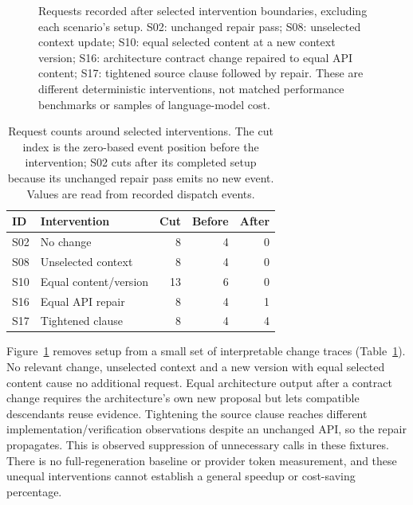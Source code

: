 \documentclass[pdflatex,sn-mathphys-num]{sn-jnl}
\theoremstyle{thmstyleone}
\theoremstyle{thmstylethree}
\theoremstyle{thmstyletwo}
\begin{document}
\begin{figure}[tbp]\centering
{}
\caption{Requests recorded after selected intervention boundaries, excluding each scenario's setup. S02: unchanged repair pass; S08: unselected context update; S10: equal selected content at a new context version; S16: architecture contract change repaired to equal API content; S17: tightened source clause followed by repair. These are different deterministic interventions, not matched performance benchmarks or samples of language-model cost.}\label{fig:request-deltas}
\end{figure}

\begin{table}[tbp]
\centering
\caption{Request counts around selected interventions. The cut index is the zero-based event position before the intervention; S02 cuts after its completed setup because its unchanged repair pass emits no new event. Values are read from recorded dispatch events.}\label{tab:request-interventions}
\footnotesize
\setlength{\tabcolsep}{3pt}
\renewcommand{\arraystretch}{1.13}
\begin{tabularx}{\linewidth}{@{}lXrrr@{}}\toprule
ID & Intervention & Cut & Before & After\\\midrule
S02 & No change & 8 & 4 & 0\\
S08 & Unselected context & 8 & 4 & 0\\
S10 & Equal content/version & 13 & 6 & 0\\
S16 & Equal API repair & 8 & 4 & 1\\
S17 & Tightened clause & 8 & 4 & 4\\
\bottomrule\end{tabularx}
\end{table}

Figure~\ref{fig:request-deltas} removes setup from a small set of interpretable change traces (Table~\ref{tab:request-interventions}). No relevant change, unselected context and a new version with equal selected content cause no additional request. Equal architecture output after a contract change requires the architecture's own new proposal but lets compatible descendants reuse evidence. Tightening the source clause reaches different implementation/verification observations despite an unchanged API, so the repair propagates. This is observed suppression of unnecessary calls in these fixtures. There is no full-regeneration baseline or provider token measurement, and these unequal interventions cannot establish a general speedup or cost-saving percentage.
\end{document}
